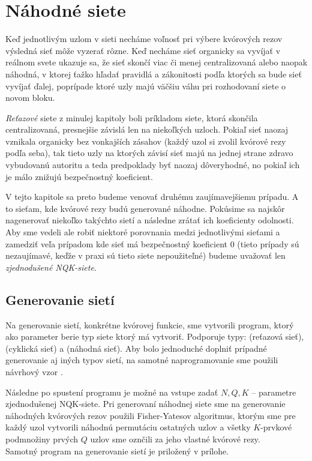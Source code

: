 \chapter {Náhodné siete}

Keď jednotlivým uzlom v sieti necháme voľnosť pri výbere kvórových rezov výsledná
sieť môže vyzerať rôzne. Keď necháme sieť organicky sa vyvíjať v reálnom svete
ukazuje sa, že sieť skončí viac či menej centralizovaná alebo naopak náhodná,
v ktorej ťažko hľadať pravidlá a zákonitosti podľa ktorých sa bude sieť vyvíjať
ďalej, poprípade ktoré uzly majú väčšiu váhu pri rozhodovaní siete o novom bloku.

\textit{Reťazové} siete z minulej kapitoly boli príkladom siete, ktorá skončila
centralizovaná, presnejšie závislá len na niekoľkých uzloch.
Pokiaľ sieť naozaj vznikala organicky bez vonkajších zásahov
(každý uzol si zvolil kvórové rezy podľa seba), tak tieto uzly na ktorých závisí 
sieť majú na jednej strane zdravo vybudovanú autoritu a teda predpoklady byť
naozaj dôveryhodné, no pokiaľ ich je málo znižujú bezpečnostný koeficient.

V tejto kapitole sa preto budeme venovať druhému zaujímavejšiemu prípadu.
A to sieťam, kde kvórové rezy budú generované náhodne. Pokúsime sa najskôr
nagenerovať niekoľko takýchto sietí a následne zrátať ich koeficienty odolnosti.
Aby sme vedeli ale robiť niektoré porovnania medzi jednotlivými sieťami a zamedziť
veľa prípadom kde sieť má bezpečnostný koeficient 0 (tieto prípady sú nezaujímavé,
keďže v praxi sú tieto siete nepoužiteľné) budeme uvažovať len
\textit{zjednodušené NQK-siete}.

\section {Generovanie sietí}

Na generovanie sietí, konkrétne kvórovej funkcie, sme vytvorili program, ktorý ako
parameter berie typ siete ktorý má vytvoriť. Podporuje typy: 
(reťazová sieť),  (cyklická sieť) a  (náhodná sieť).
Aby bolo jednoduché doplniť prípadné generovanie aj iných typov sietí, na samotné
naprogramovanie sme použili návrhový vzor \cite{gamma1995design}.

Následne po spustení programu je možné na vstupe zadať $N, Q, K$ -- parametre
zjednodušenej NQK-siete.
Pri generovaní náhodnej siete sme na generovanie náhodných kvórových rezov použili
Fisher-Yatesov algoritmus\cite{fisher1943statistical}, ktorým sme pre každý uzol
vytvorili náhodnú permutáciu ostatných uzlov a všetky $K$-prvkové podmnožiny
prvých $Q$ uzlov sme oznčili za jeho vlastné kvórové rezy.\\
Samotný program na generovanie sietí je priložený v prílohe.

